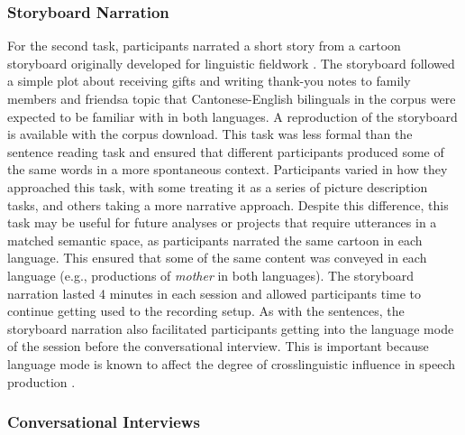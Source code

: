 \subsubsection{Storyboard Narration}\label{ch2:subsec:storyboard}

For the second task, participants narrated a short story from a cartoon storyboard originally developed for linguistic fieldwork \citep{littell_2010_thank}. The storyboard followed a simple plot about receiving gifts and writing thank-you notes to family members and friends\textemdash a topic that Cantonese-English bilinguals in the corpus were expected to be familiar with in both languages. A reproduction of the storyboard is available with the corpus download. This task was less formal than the sentence reading task and ensured that different participants produced some of the same words in a more spontaneous context. Participants varied in how they approached this task, with some treating it as a series of picture description tasks, and others taking a more narrative approach. Despite this difference, this task may be useful for future analyses or projects that require utterances in a matched semantic space, as participants narrated the same cartoon in each language. This ensured that some of the same content was conveyed in each language (e.g., productions of \textit{mother} in both languages). The storyboard narration lasted 4 minutes in each session and allowed participants time to continue getting used to the recording setup. As with the sentences, the storyboard narration also facilitated participants getting into the language mode of the session before the conversational interview. This is important because language mode is known to affect the degree of crosslinguistic influence in speech production \citep{simonet_2019_convergence}.

\subsubsection{Conversational Interviews}\label{ch2:subsec:interview}

